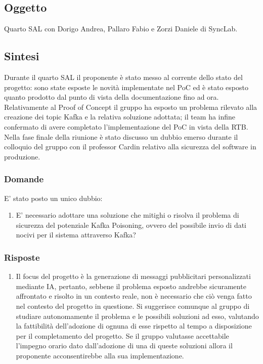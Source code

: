 \documentclass[10pt]{article}
\begin{document}
\subsection{Oggetto}
Quarto SAL con Dorigo Andrea, Pallaro Fabio e Zorzi Daniele di SyncLab.

\subsection{Sintesi}
Durante il quarto SAL il proponente è stato messo al corrente dello stato del progetto: sono state esposte le novità implementate nel PoC
ed è stato esposto quanto prodotto dal punto di vista della documentazione fino ad ora. Relativamente al Proof of Concept il gruppo ha
esposto un problema rilevato alla creazione dei topic Kafka e la relativa soluzione adottata; il team ha infine confermato di avere 
completato l'implementazione del PoC in vista della RTB.
Nella fase finale della riunione  è stato discusso un dubbio emerso durante il colloquio del gruppo con il professor Cardin relativo 
alla sicurezza del software in produzione.

\subsubsection{Domande}
E' stato posto un unico dubbio:
\begin{enumerate}
	\item E' necessario adottare una soluzione che mitighi o risolva il problema di sicurezza del potenziale Kafka Poisoning, ovvero
	del possibile invio di dati nocivi per il sistema attraverso Kafka?
\end{enumerate}

\subsubsection{Risposte}
\begin{enumerate}
	\item Il focus del progetto è la generazione di messaggi pubblicitari personalizzati mediante IA, pertanto, sebbene il problema esposto
	andrebbe sicuramente affrontato e risolto in un contesto reale, non è necessario che ciò venga fatto nel contesto del progetto in questione.
	Si suggerisce comunque al gruppo di studiare autonomamente il problema e le possibili soluzioni ad esso, valutando la fattibilità
	dell'adozione di ognuna di esse rispetto al tempo a disposizione per il completamento del progetto. Se il gruppo valutasse accettabile
	l'impegno orario dato dall'adozione di una di queste soluzioni allora il proponente acconsentirebbe alla sua implementazione. 
\end{enumerate}
\end{document}
